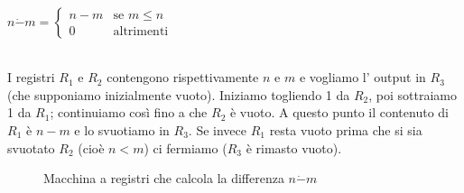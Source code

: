 \begin{esempio}[Differenza] \ \\
    \begin{center}
    $n \dot{-} m=
\left\{ \begin{array}{ll}
n-m & \textrm{se } m \leq n\\
0 & \textrm{altrimenti}
\end{array} \right.$
    \end{center}


    \ \\ I registri \( R_1 \) e \( R_2 \) contengono rispettivamente
    \( n \) e \( m \) e vogliamo l' output in \( R_{3} \) (che
    supponiamo inizialmente vuoto). Iniziamo togliendo 1 da \( R_2 \),
    poi sottraiamo 1 da \( R_1 \); continuiamo cos\`i fino a che \(
R_2 \) \`e vuoto. A questo punto il contenuto di \( R_1 \) \`e $n
- m$ e lo svuotiamo in \( R_{3} \). Se invece \( R_1 \) resta
    vuoto prima che si sia svuotato \( R_2 \) (cio\`e $n < m$) ci
    fermiamo (\( R_{3} \) \`e rimasto vuoto).

    \begin{figure}[hbtp]
    \hspace{0cm}

    \caption{Macchina a registri che calcola la differenza $n \dot{-} m$}
    \end{figure}

\end{esempio}

